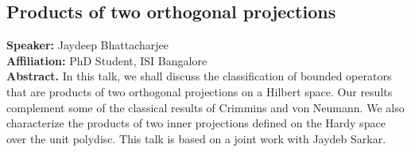 
\subsection*{Products of two orthogonal projections} %
\noindent
\textbf{Speaker:} Jaydeep Bhattacharjee\\ %
\textbf{Affiliation:} PhD Student, ISI Bangalore \\ %

\noindent\textbf{Abstract.} In this talk, we shall discuss the classification of bounded operators that are products of two orthogonal projections on a Hilbert space. Our results complement some of the classical results of Crimmins and von Neumann. We also characterize the products of two inner projections defined on the Hardy space over the unit polydisc. This talk is based on a joint work with Jaydeb Sarkar.

